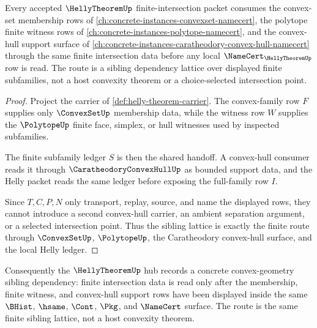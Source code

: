 \begin{proposition}
\label{prop:helly-theorem-convex-geometry-sibling-lattice-route}
Every accepted $\HellyTheoremUp$ finite-intersection packet consumes the convex-set membership rows of \autoref{ch:concrete-instances-convexset-namecert}, the polytope finite witness rows of \autoref{ch:concrete-instances-polytope-namecert}, and the convex-hull support surface of \autoref{ch:concrete-instances-caratheodory-convex-hull-namecert} through the same finite intersection data before any local $\NameCert_{\HellyTheoremUp}$ row is read. The route is a sibling dependency lattice over displayed finite subfamilies, not a host convexity theorem or a choice-selected intersection point.
\end{proposition}
\begin{proof}
Project the carrier of \autoref{def:helly-theorem-carrier}. The convex-family row $F$ supplies only $\ConvexSetUp$ membership data, while the witness row $W$ supplies the $\PolytopeUp$ finite face, simplex, or hull witnesses used by inspected subfamilies.

The finite subfamily ledger $S$ is then the shared handoff. A convex-hull consumer reads it through $\CaratheodoryConvexHullUp$ as bounded support data, and the Helly packet reads the same ledger before exposing the full-family row $I$.

Since $T,C,P,N$ only transport, replay, source, and name the displayed rows, they cannot introduce a second convex-hull carrier, an ambient separation argument, or a selected intersection point. Thus the sibling lattice is exactly the finite route through $\ConvexSetUp$, $\PolytopeUp$, the Caratheodory convex-hull surface, and the local Helly ledger.
\end{proof}

Consequently the $\HellyTheoremUp$ hub records a concrete convex-geometry sibling dependency: finite intersection data is read only after the membership, finite witness, and convex-hull support rows have been displayed inside the same $\BHist$, $\hsame$, $\Cont$, $\Pkg$, and $\NameCert$ surface. The route is the same finite sibling lattice, not a host convexity theorem.
